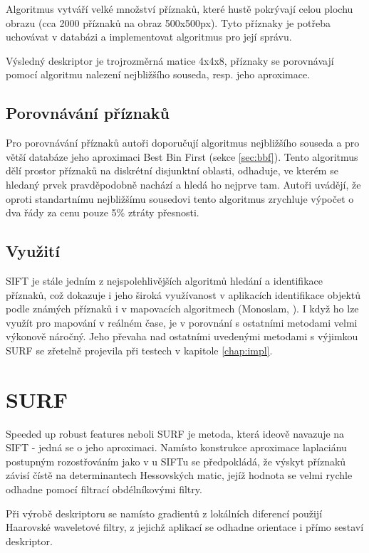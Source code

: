 	Algoritmus vytváří velké množství příznaků, které hustě pokrývají celou plochu obrazu (cca 2000 příznaků na obraz 500x500px). Tyto příznaky je potřeba uchovávat v databázi a implementovat algoritmus pro její správu.
	
	Výsledný deskriptor je trojrozměrná matice 4x4x8, příznaky se porovnávají pomocí algoritmu nalezení nejbližšího souseda, resp. jeho aproximace.
	
	\subsection{Porovnávání příznaků}
	
	Pro porovnávání příznaků autoři doporučují algoritmus nejbližšího souseda a pro větší databáze jeho aproximaci Best Bin First (sekce \ref{sec:bbf}). Tento algoritmus dělí prostor příznaků na diskrétní disjunktní oblasti, odhaduje, ve kterém se hledaný prvek pravděpodobně nachází a hledá ho nejprve tam. Autoři uvádějí, že oproti standartnímu nejbližšímu sousedovi tento algoritmus zrychluje výpočet o dva řády za cenu pouze 5\% ztráty přesnosti.
	
	\subsection{Využití}
	
	SIFT je stále jedním z nejspolehlivějších algoritmů hledání a identifikace příznaků, což dokazuje i jeho široká využívanost v aplikacích identifikace objektů podle známých příznaků i v mapovacích algoritmech (Monoslam, \cite{slam_monoslam} ). I když ho lze využít pro mapování v reálném čase, je v porovnání s ostatními metodami velmi výkonově náročný. Jeho převaha nad ostatními uvedenými metodami s výjimkou SURF se zřetelně projevila při testech v kapitole \ref{chap:impl}.


\section{SURF}

	Speeded up robust features neboli SURF \cite{bay2006surf} je metoda, která ideově navazuje na SIFT - jedná se o jeho aproximaci. Namísto konstrukce aproximace laplaciánu postupným rozostřováním jako v u SIFTu se předpokládá, že výskyt příznaků závisí čístě na determinantech Hessovských matic, jejíž hodnota se velmi rychle odhadne pomocí filtrací obdélníkovými filtry.
	
	Při výrobě deskriptoru se namísto gradientů z lokálních diferencí použijí Haarovské waveletové filtry, z jejichž aplikací se odhadne orientace i přímo sestaví deskriptor. 
	
